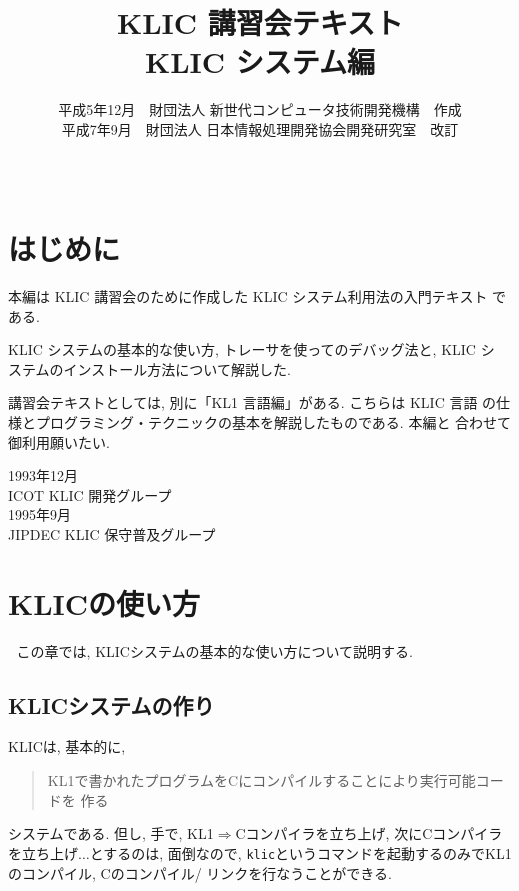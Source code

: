 \documentclass[a4,titlepage]{jsreport}
\title{KLIC 講習会テキスト\\KLIC システム編}
\date{\ }
\author{平成5年12月~~財団法人 新世代コンピュータ技術開発機構~~作成
\\平成7年9月~~財団法人 日本情報処理開発協会開発研究室~~改訂}
\begin{document}
\renewcommand{\textfraction}{0.2}
\renewcommand{\topfraction}{0.7}
\renewcommand{\bottomfraction}{0.7}
\renewcommand{\floatpagefraction}{0.7}
\addtolength{\textheight}{27pt}
\addtolength{\topmargin}{-18pt}

\makeatletter
\let\savedchap\@makechapterhead
\def\@makechapterhead{\vspace*{-1cm}\savedchap}
\makeatletter

\maketitle

\chapter*{はじめに}

\bgroup\large
本編は KLIC 講習会のために作成した KLIC システム利用法の入門テキスト
である.

KLIC システムの基本的な使い方, トレーサを使ってのデバッグ法と, KLIC シ
ステムのインストール方法について解説した.

講習会テキストとしては, 別に「KL1 言語編」がある.  こちらは KLIC 言語
の仕様とプログラミング・テクニックの基本を解説したものである.  本編と
合わせて御利用願いたい.

\begin{flushright}
1993年12月\\
ICOT KLIC 開発グループ\\
1995年9月\\
JIPDEC KLIC 保守普及グループ\\
\end{flushright}
\egroup
\thispagestyle{empty}

\newpage
\setcounter{page}{0}
\tableofcontents

\chapter{KLICの使い方}
\setcounter{page}{0}
\pagestyle{plain}

この章では, KLICシステムの基本的な使い方について説明する.  

\section{KLICシステムの作り}
KLICは, 基本的に, 

\begin{quote}
KL1で書かれたプログラムをCにコンパイルすることにより実行可能コードを
作る
\end{quote}
システムである.  但し, 手で, KL1$\Rightarrow$Cコンパイラを立ち上げ, 
次にCコンパイラを立ち上げ$\ldots$とするのは, 面倒なので, 
\verb|klic|というコマンドを起動するのみでKL1のコンパイル, Cのコンパイル/
リンクを行なうことができる.  
\end{document}
